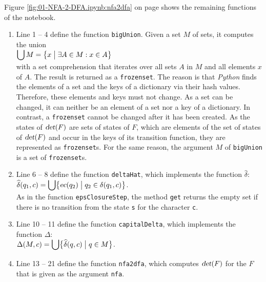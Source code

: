 \noindent
Figure \ref{fig:01-NFA-2-DFA.ipynb:nfa2dfa} on page \pageref{fig:01-NFA-2-DFA.ipynb:nfa2dfa} shows the remaining
functions of the notebook.
\begin{enumerate}
\item Line 1 -- 4 define the function \texttt{bigUnion}.  Given a set $M$ of sets, it computes the union
      \\[0.2cm]
      \hspace*{1.3cm}
      $\displaystyle \bigcup M = \bigl\{ x \bigm| \exists A \in M: x \in A \bigr\}$
      \\[0.2cm]
      with a set comprehension that iterates over all sets $A$ in $M$ and all elements $x$ of $A$.  The result
      is returned as a \texttt{frozenset}.  The reason is that \textsl{Python} finds the elements of a set and
      the keys of a dictionary via their hash values.  Therefore, these elements and keys must not change.  As a
      set can be changed, it can neither be an element of a set nor a key of a dictionary.  In contrast, a
      \texttt{frozenset} cannot be changed after it has been created.  As the states of $\textsl{det}(F)$ are
      sets of states of $F$, which are elements of the set of states of $\textsl{det}(F)$ and occur in the keys
      of its transition function, they are represented as \texttt{frozenset}s.  For the same reason, the
      argument $M$ of \texttt{bigUnion} is a set of \texttt{frozenset}s.
\item Line 6 -- 8 define the function \texttt{deltaHat}, which implements the function $\widehat{\delta}$:
      \\[0.2cm]
      \hspace*{1.3cm}
      $\displaystyle\widehat{\delta}(q_1, c) = \bigcup \bigl\{ \textsl{ec}(q_2) \bigm| q_2 \in \delta(q_1, c) \bigr\}$.
      \\[0.2cm]
      As in the function \texttt{epsClosureStep}, the method \texttt{get} returns the empty set if there is no
      transition from the state \texttt{s} for the character \texttt{c}.
\item Line 10 -- 11 define the function \texttt{capitalDelta}, which implements the function $\Delta$:
      \\[0.2cm]
      \hspace*{1.3cm}
      $\displaystyle\Delta(M,c) = \bigcup \bigl\{ \widehat{\delta}(q,c) \bigm| q \in M \bigr\}$.
\item Line 13 -- 21 define the function \texttt{nfa2dfa}, which computes $\textsl{det}(F)$ for the
       $F$ that is given as the argument \texttt{nfa}.

\end{enumerate}
